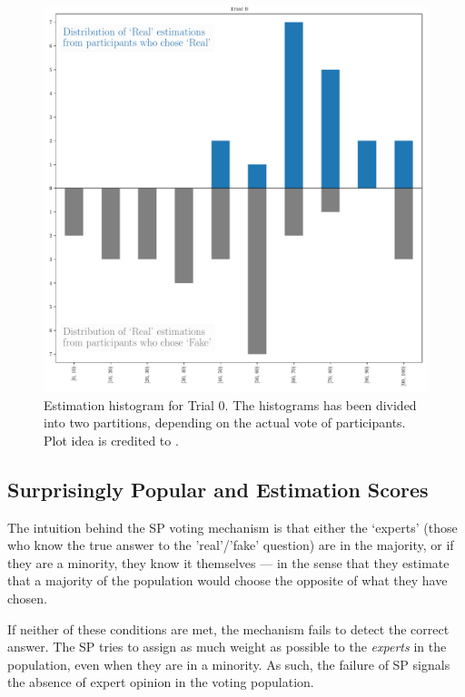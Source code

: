 \documentclass{report}
\theoremstyle{definition}
\begin{document}
\begin{figure}[H]
    \centering
    \includegraphics[width=\textwidth]{exp1_estim_trial0.pdf}
    \caption{Estimation histogram for Trial 0. The histograms has been divided into two partitions, depending on the actual vote of participants. Plot idea is credited to \cite{lee:NFL}.}
    \label{fig:exp1_estim_trial0}
\end{figure}

\subsection{Surprisingly Popular and Estimation Scores}
\label{sec:SP_estim_scores}
The intuition behind the SP voting mechanism is that either the `experts' (those who know the true answer to the 'real'/'fake' question) are in the majority, or if they are a minority, they know it themselves --- in the sense that they estimate that a majority of the population would choose the opposite of what they have chosen.

If neither of these conditions are met, the mechanism fails to detect the correct answer. The SP tries to assign as much weight as possible to the \emph{experts} in the population, even when they are in a minority. As such, the failure of SP signals the absence of expert opinion in the voting population. 
\end{document}
